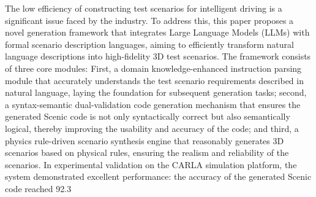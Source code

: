 \begin{abstracten}
	
	The low efficiency of constructing test scenarios for intelligent driving is a significant issue faced by the industry. To address this, this paper proposes a novel generation framework that integrates Large Language Models (LLMs) with formal scenario description languages, aiming to efficiently transform natural language descriptions into high-fidelity 3D test scenarios. The framework consists of three core modules: First, a domain knowledge-enhanced instruction parsing module that accurately understands the test scenario requirements described in natural language, laying the foundation for subsequent generation tasks; second, a syntax-semantic dual-validation code generation mechanism that ensures the generated Scenic code is not only syntactically correct but also semantically logical, thereby improving the usability and accuracy of the code; and third, a physics rule-driven scenario synthesis engine that reasonably generates 3D scenarios based on physical rules, ensuring the realism and reliability of the scenarios. In experimental validation on the CARLA simulation platform, the system demonstrated excellent performance: the accuracy of the generated Scenic code reached 92.3%
	
\end{abstracten}